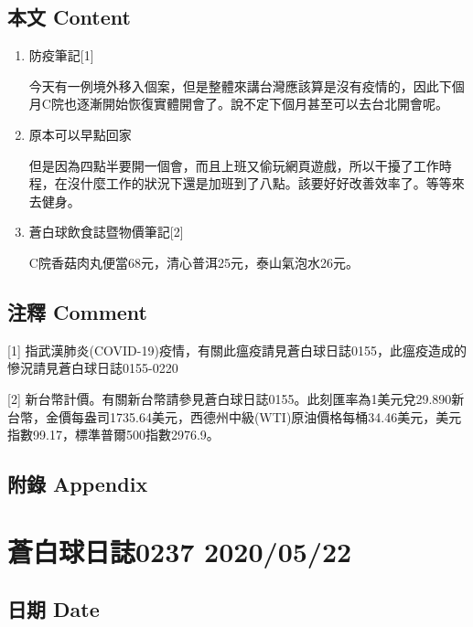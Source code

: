 \documentclass[a5paper, 12pt
]{book}
\begin{document}
\hypertarget{ux672cux6587-content-81}{%
\subsection{本文 Content}\label{ux672cux6587-content-81}}

\begin{enumerate}
\def\labelenumi{\arabic{enumi}.}
\item
  防疫筆記{[}1{]}

  今天有一例境外移入個案，但是整體來講台灣應該算是沒有疫情的，因此下個月C院也逐漸開始恢復實體開會了。說不定下個月甚至可以去台北開會呢。
\item
  原本可以早點回家

  但是因為四點半要開一個會，而且上班又偷玩網頁遊戲，所以干擾了工作時程，在沒什麼工作的狀況下還是加班到了八點。該要好好改善效率了。等等來去健身。
\item
  蒼白球飲食誌暨物價筆記{[}2{]}

  C院香菇肉丸便當68元，清心普洱25元，泰山氣泡水26元。
\end{enumerate}

\hypertarget{ux6ce8ux91cb-comment-81}{%
\subsection{注釋 Comment}\label{ux6ce8ux91cb-comment-81}}

{[}1{]}
指武漢肺炎(COVID-19)疫情，有關此瘟疫請見蒼白球日誌0155，此瘟疫造成的慘況請見蒼白球日誌0155-0220

{[}2{]}
新台幣計價。有關新台幣請參見蒼白球日誌0155。此刻匯率為1美元兌29.890新台幣，金價每盎司1735.64美元，西德州中級(WTI)原油價格每桶34.46美元，美元指數99.17，標準普爾500指數2976.9。

\hypertarget{ux9644ux9304-appendix-81}{%
\subsection{附錄 Appendix}\label{ux9644ux9304-appendix-81}}

\hypertarget{ux84bcux767dux7403ux65e5ux8a8c0237-20200522}{%
\section{蒼白球日誌0237
2020/05/22}\label{ux84bcux767dux7403ux65e5ux8a8c0237-20200522}}

\hypertarget{ux65e5ux671f-date-82}{%
\subsection{日期 Date}\label{ux65e5ux671f-date-82}}
\end{document}

